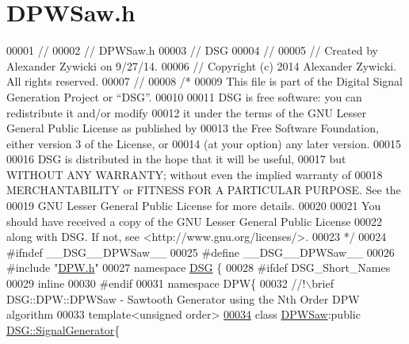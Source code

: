 \hypertarget{_d_p_w_saw_8h_source}{\section{D\+P\+W\+Saw.\+h}
\label{_d_p_w_saw_8h_source}
}

\begin{DoxyCode}
00001 \textcolor{comment}{//}
00002 \textcolor{comment}{//  DPWSaw.h}
00003 \textcolor{comment}{//  DSG}
00004 \textcolor{comment}{//}
00005 \textcolor{comment}{//  Created by Alexander Zywicki on 9/27/14.}
00006 \textcolor{comment}{//  Copyright (c) 2014 Alexander Zywicki. All rights reserved.}
00007 \textcolor{comment}{//}
00008 \textcolor{comment}{/*}
00009 \textcolor{comment}{ This file is part of the Digital Signal Generation Project or “DSG”.}
00010 \textcolor{comment}{}
00011 \textcolor{comment}{ DSG is free software: you can redistribute it and/or modify}
00012 \textcolor{comment}{ it under the terms of the GNU Lesser General Public License as published by}
00013 \textcolor{comment}{ the Free Software Foundation, either version 3 of the License, or}
00014 \textcolor{comment}{ (at your option) any later version.}
00015 \textcolor{comment}{}
00016 \textcolor{comment}{ DSG is distributed in the hope that it will be useful,}
00017 \textcolor{comment}{ but WITHOUT ANY WARRANTY; without even the implied warranty of}
00018 \textcolor{comment}{ MERCHANTABILITY or FITNESS FOR A PARTICULAR PURPOSE.  See the}
00019 \textcolor{comment}{ GNU Lesser General Public License for more details.}
00020 \textcolor{comment}{}
00021 \textcolor{comment}{ You should have received a copy of the GNU Lesser General Public License}
00022 \textcolor{comment}{ along with DSG.  If not, see <http://www.gnu.org/licenses/>.}
00023 \textcolor{comment}{ */}
00024 \textcolor{preprocessor}{#ifndef \_\_DSG\_\_DPWSaw\_\_}
00025 \textcolor{preprocessor}{#define \_\_DSG\_\_DPWSaw\_\_}
00026 \textcolor{preprocessor}{#include "\hyperlink{_d_p_w_8h}{DPW.h}"}
00027 \textcolor{keyword}{namespace }\hyperlink{namespace_d_s_g}{DSG} \{
00028 \textcolor{preprocessor}{#ifdef DSG\_Short\_Names}
00029     \textcolor{keyword}{inline}
00030 \textcolor{preprocessor}{#endif}
00031     \textcolor{keyword}{namespace }DPW\{\textcolor{comment}{}
00032 \textcolor{comment}{        //!\(\backslash\)brief DSG::DPW::DPWSaw - Sawtooth Generator using the Nth Order DPW algorithm }
00033 \textcolor{comment}{}        \textcolor{keyword}{template}<\textcolor{keywordtype}{unsigned} order>
\hypertarget{_d_p_w_saw_8h_source_l00034}{}\hyperlink{class_d_s_g_1_1_d_p_w_1_1_d_p_w_saw}{00034}         \textcolor{keyword}{class }\hyperlink{class_d_s_g_1_1_d_p_w_1_1_d_p_w_saw}{DPWSaw}:\textcolor{keyword}{public} \hyperlink{class_d_s_g_1_1_signal_generator}{DSG::SignalGenerator}\{

\end{DoxyCode}
